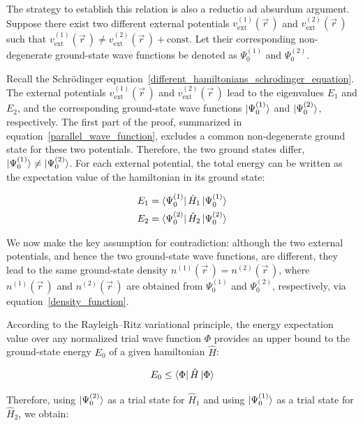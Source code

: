 The strategy to establish this relation is also a reductio ad absurdum argument.
Suppose there exist two different external potentials $v^{(1)}_\mathrm{ext}(\vec{r}\,)$ and $v^{(2)}_\mathrm{ext}(\vec{r}\,)$ such that $v^{(1)}_\mathrm{ext}(\vec{r}\,)\neq v^{(2)}_\mathrm{ext}(\vec{r}\,)+\mathrm{const.}$
Let their corresponding non-degenerate ground-state wave functions be denoted as $\Psi_0^{(1)}$ and $\Psi_0^{(2)}$.

Recall the Schrödinger equation~\eqref{different_hamiltonians_schrodinger_equation}.
The external potentials $v^{(1)}_\mathrm{ext}(\vec{r}\,)$ and $v^{(2)}_\mathrm{ext}(\vec{r}\,)$ lead to the eigenvalues $E_1$ and $E_2$, and the corresponding ground-state wave functions $\ket{\Psi_0^{(1)}}$ and $\ket{\Psi_0^{(2)}}$, respectively.
The first part of the proof, summarized in equation~\eqref{parallel_wave_function}, excludes a common non-degenerate ground state for these two potentials.
Therefore, the two ground states differ, $\ket{\Psi_0^{(1)}}\neq\ket{\Psi_0^{(2)}}$.
For each external potential, the total energy can be written as the expectation value of the hamiltonian in its ground state:

\begin{equation}
\begin{aligned}
    E_1 &= \bra{\Psi_0^{(1)}}\hat{H}_1\ket{\Psi_0^{(1)}} \\
    E_2 &= \bra{\Psi_0^{(2)}}\hat{H}_2\ket{\Psi_0^{(2)}}
\end{aligned}
\label{different_total_energies}
\end{equation}

We now make the key assumption for contradiction: although the two external potentials, and hence the two ground-state wave functions, are different, they lead to the same ground-state density $n^{(1)}(\vec{r}\,)=n^{(2)}(\vec{r}\,)$, where $n^{(1)}(\vec{r}\,)$ and $n^{(2)}(\vec{r}\,)$ are obtained from $\Psi_0^{(1)}$ and $\Psi_0^{(2)}$, respectively, via equation~\eqref{density_function}.

According to the Rayleigh--Ritz variational principle, the energy expectation value over any normalized trial wave function $\Phi$ provides an upper bound to the ground-state energy $E_0$ of a given hamiltonian $\hat{H}$:

\begin{equation}
    E_0\leq \bra{\Phi}\hat{H}\ket{\Phi}
\label{Rayleigh-Ritz_principle}
\end{equation}

Therefore, using $\ket{\Psi_0^{(2)}}$ as a trial state for $\hat{H}_1$ and using $\ket{\Psi_0^{(1)}}$ as a trial state for $\hat{H}_2$, we obtain:

